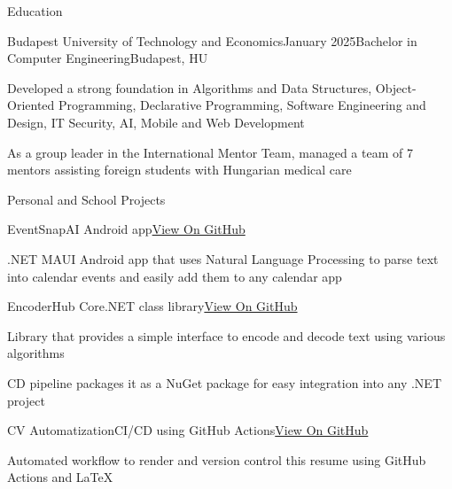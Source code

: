 \documentclass[
	a4paper, %
	11pt, %
]{resume} %
\begin{document}

\begin{rSection}{Education}

	\begin{rSubsection}{Budapest University of Technology and Economics}{January 2025}{Bachelor in Computer Engineering}{Budapest, HU}
		\item Developed a strong foundation in Algorithms and Data Structures, Object-Oriented Programming, Declarative Programming, Software Engineering and Design, IT Security, AI, Mobile and Web Development
		\item As a group leader in the International Mentor Team, managed a team of 7 mentors assisting foreign students with Hungarian medical care
	\end{rSubsection}

\end{rSection}


\begin{rSection}{Personal and School Projects}

	\begin{rSubsection}{EventSnap}{}{AI Android app}{\href{https://github.com/nahu02/EventSnap}{View On GitHub}}
		\item .NET MAUI Android app that uses Natural Language Processing to parse text into calendar events and easily add them to any calendar app
	\end{rSubsection}

	\begin{rSubsection}{EncoderHub Core}{}{.NET class library}{\href{https://github.com/nahu02/EncoderHubCore}{View On GitHub}}
		\item Library that provides a simple interface to encode and decode text using various algorithms
		\item CD pipeline packages it as a NuGet package for easy integration into any .NET project
	\end{rSubsection}

	\begin{rSubsection}{CV Automatization}{}{CI/CD using GitHub Actions}{\href{https://github.com/nahu02/CV}{View On GitHub}}
		\item Automated workflow to render and version control this resume using GitHub Actions and \LaTeX{}
	\end{rSubsection}

\end{rSection}
\end{document}
